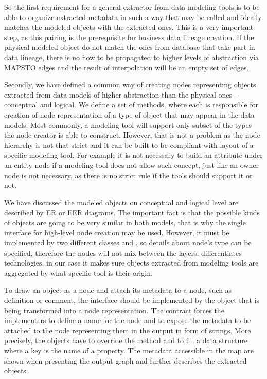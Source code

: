 So the first requirement for a general extractor from data modeling tools is to be able to organize extracted metadata in such a way that  may be called and ideally matches the modeled objects with the extracted ones.
This is a very important step, as this pairing is the prerequisite for business data lineage creation. If the physical modeled object do not match the ones from database that take part in data lineage, there is no flow to be propagated to higher levels of abstraction via MAPS\textunderscore TO edges and the result of interpolation will be an empty set of edges.

Secondly, we have defined a common way of creating nodes representing objects extracted from data models of higher abstraction than the physical ones - conceptual and logical.
We define a set of methods, where each is responsible for creation of node representation of a type of object that may appear in the data models. Most commonly, a modeling tool will support only subset of the types the node creator is able to construct. 
However, that is not a problem as the node hierarchy is not that strict and it can be built to be compliant with layout of a specific modeling tool. 
For example it is not necessary to build an attribute under an entity node if a modeling tool does not allow such concept, just like an owner node is not necessary, as there is no strict rule if the tools should support it or not.

We have discussed the modeled objects on conceptual and logical level are described by ER or EER diagrams. 
The important fact is that the possible kinds of objects are going to be very similar in both models, that is why the single interface  for high-level node creation may be used.
However, it must be implemented by two different classes  and , so details about node's type can be specified, therefore the nodes will not mix between the layers.
 differentiates technologies, in our case it makes sure objects extracted from modeling tools are aggregated by what specific tool is their origin.

To draw an object as a node and attach its metadata to a node, such as definition or comment, the  interface should be implemented by the object that is being transformed into a node representation.
The contract forces the implementers to define a name for the node and to expose the metadata to be attached to the node representing them in the output in form of strings. 
More precisely, the objects have to override the  method and to fill a  data structure where a key is the name of a property. 
The metadata accessible in the map are shown when presenting the output graph and further describes the extracted objects. \\ 

